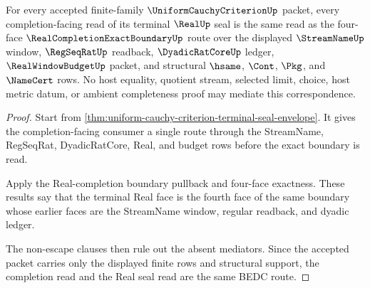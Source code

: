 \begin{theorem}
\label{thm:uniform-cauchy-criterion-completion-real-correspondence}
For every accepted finite-family $\UniformCauchyCriterionUp$ packet, every completion-facing read of its terminal $\RealUp$ seal is the same read as the four-face $\RealCompletionExactBoundaryUp$ route over the displayed $\StreamNameUp$ window, $\RegSeqRatUp$ readback, $\DyadicRatCoreUp$ ledger, $\RealWindowBudgetUp$ packet, and structural $\hsame$, $\Cont$, $\Pkg$, and $\NameCert$ rows. No host equality, quotient stream, selected limit, choice, host metric datum, or ambient completeness proof may mediate this correspondence.
\end{theorem}
\begin{proof}
Start from \autoref{thm:uniform-cauchy-criterion-terminal-seal-envelope}. It gives the completion-facing consumer a single route through the StreamName, RegSeqRat, DyadicRatCore, Real, and budget rows before the exact boundary is read.

Apply the Real-completion boundary pullback and four-face exactness. These results say that the terminal Real face is the fourth face of the same boundary whose earlier faces are the StreamName window, regular readback, and dyadic ledger.

The non-escape clauses then rule out the absent mediators. Since the accepted packet carries only the displayed finite rows and structural support, the completion read and the Real seal read are the same BEDC route.
\end{proof}

